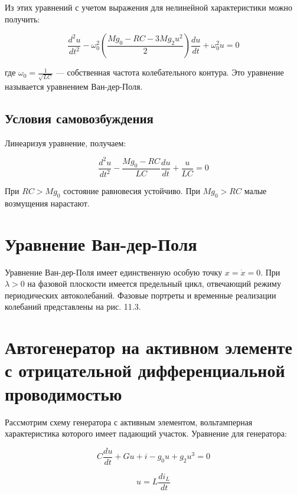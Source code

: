 \documentclass[a4paper,12pt]{article}
\begin{document}
Из этих уравнений с учетом выражения для нелинейной характеристики можно получить:

\begin{equation}
\frac{d^2 u}{dt^2} - \omega_0^2 \left( \frac{Mg_0 - RC - 3Mg_2 u^2}{2} \right) \frac{du}{dt} + \omega_0^2 u = 0
\end{equation}

где $\omega_0 = \frac{1}{\sqrt{LC}}$ — собственная частота колебательного контура. Это уравнение называется уравнением Ван-дер-Поля.

\subsection{Условия самовозбуждения}

Линеаризуя уравнение, получаем:

\begin{equation}
\frac{d^2 u}{dt^2} - \frac{Mg_0 - RC}{LC} \frac{du}{dt} + \frac{u}{LC} = 0
\end{equation}

При $RC > Mg_0$ состояние равновесия устойчиво. При $Mg_0 > RC$ малые возмущения нарастают.

\section{Уравнение Ван-дер-Поля}

Уравнение Ван-дер-Поля имеет единственную особую точку $x = \dot{x} = 0$. При $\lambda > 0$ на фазовой плоскости имеется предельный цикл, отвечающий режиму периодических автоколебаний. Фазовые портреты и временные реализации колебаний представлены на рис. 11.3.


\section{Автогенератор на активном элементе с отрицательной дифференциальной проводимостью}

Рассмотрим схему генератора с активным элементом, вольтамперная характеристика которого имеет падающий участок. Уравнение для генератора:

\begin{equation}
C \frac{du}{dt} + Gu + i - g_0 u + g_2 u^3 = 0
\end{equation}

\begin{equation}
u = L \frac{di_L}{dt}
\end{equation}
\end{document}
